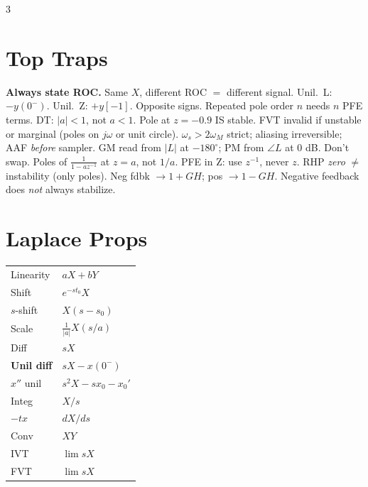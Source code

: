 \documentclass[11pt]{extarticle}
\newcommand{\rtable}[1]{\noindent\hfill#1}
\begin{document}
\begin{paracol}{3}
\section*{Top Traps}
\textbf{Always state ROC.} Same $X$, different ROC $=$ different signal.
Unil.\ L: $\mathbf{-}y(0^-)$. Unil.\ Z: $\mathbf{+}y[-1]$. Opposite signs.
Repeated pole order $n$ needs $n$ PFE terms.
DT: $|a|{<}1$, not $a{<}1$. Pole at $z{=}{-}0.9$ IS stable.
FVT invalid if unstable or marginal (poles on $j\omega$ or unit circle).
$\omega_s>2\omega_M$ strict; aliasing irreversible; AAF \emph{before} sampler.
GM read from $|L|$ at $-180^\circ$; PM from $\angle L$ at 0 dB. Don't swap.
Poles of $\tfrac{1}{1-az^{-1}}$ at $z=a$, not $1/a$.
PFE in Z: use $z^{-1}$, never $z$.
RHP \emph{zero} $\ne$ instability (only poles).
Neg fdbk $\to 1+GH$; pos $\to 1-GH$.
Negative feedback does \emph{not} always stabilize.

\switchcolumn

\rtable{%
\begin{minipage}[t]{\columnwidth}
\section*{\hfill Laplace Props}
\hfill\begin{tabular}{@{}l l@{}}
\toprule
Linearity & $aX{+}bY$ \\
Shift & $e^{-st_0}X$ \\
$s$-shift & $X(s{-}s_0)$ \\
Scale & $\tfrac{1}{|a|}X(s/a)$ \\
Diff & $sX$ \\
\textbf{Unil diff} & $sX{-}x(0^-)$ \\
$x''$ unil & $s^2X{-}sx_0{-}x_0'$ \\
Integ & $X/s$ \\
$-tx$ & $dX/ds$ \\
Conv & $XY$ \\
IVT & $\lim sX$ \\
FVT & $\lim sX$ \\
\bottomrule
\end{tabular}
\end{minipage}
}

\vspace{6pt}
\rtable{%
\begin{minipage}[t]{\columnwidth}

\end{minipage}}
\end{paracol}
\end{document}
